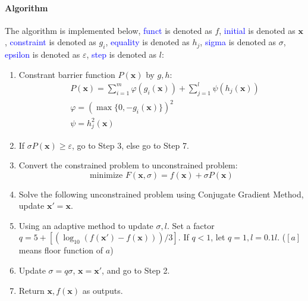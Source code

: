 \documentclass{article}
\begin{document}
\paragraph{Algorithm}
The algorithm is implemented below, \textcolor{blue}{funct} is denoted as $f$, \textcolor{blue}{initial} is denoted as $\mathbf{x}$, \textcolor{blue}{constraint} is denoted as $g_i$, \textcolor{blue}{equality} is denoted as $h_j$, \textcolor{blue}{sigma} is denoted as $\sigma$,  \textcolor{blue}{epsilon} is denoted as $\varepsilon$, \textcolor{blue}{step} is denoted as $l$:
\begin{enumerate}
    \item Constrant barrier function $P(\mathbf{x})$ by $g, h$:
    \begin{align*}
        & P(\mathbf{x}) = \sum_{i = 1}^{m}{\varphi(g_i(\mathbf{x}))} + \sum_{j = 1}^{l}{\psi(h_j(\mathbf{x}))} \\
        & \varphi = (\max\{0, -g_i(\mathbf{x})\})^2 \\
        & \psi = h_j^2(\mathbf{x})
    \end{align*}
    \item If $\sigma P(\mathbf{x}) \geqslant \varepsilon$, go to Step 3, else go to Step 7.
    \item Convert the constrained problem to unconstrained problem:
    \begin{equation*}
        \mbox{minimize } F(\mathbf{x}, \sigma) = f(\mathbf{x}) + \sigma P(\mathbf{x})
    \end{equation*}
    \item Solve the following unconstrained problem using Conjugate Gradient Method, update $\mathbf{x'} = \mathbf{x}$.
    \item Using an adaptive method to update $\sigma, l$. Set a factor $q = 5 + [(\log_{10}{(f(\mathbf{x'}) - f(\mathbf{x}))}) / {3}]$. If $q < 1$, let $q = 1, l = 0.1l$. ($[a]$ means floor function of $a$)
    \item Update $\sigma = q\sigma$, $\mathbf{x} = \mathbf{x'}$, and go to Step 2.
    \item Return $\mathbf{x}, f(\mathbf{x})$ as outputs.
\end{enumerate}
\end{document}
